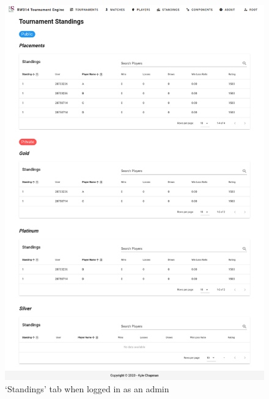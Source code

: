 \documentclass[a4paper, 11pt]{report}
\begin{document}
\begin{figure}[H]
	\centering
	\includegraphics[scale=0.33]{standings-admin.png}
	\caption{`Standings' tab when logged in as an admin}
	\label{fig:standings-admin}
\end{figure}
\end{document}

